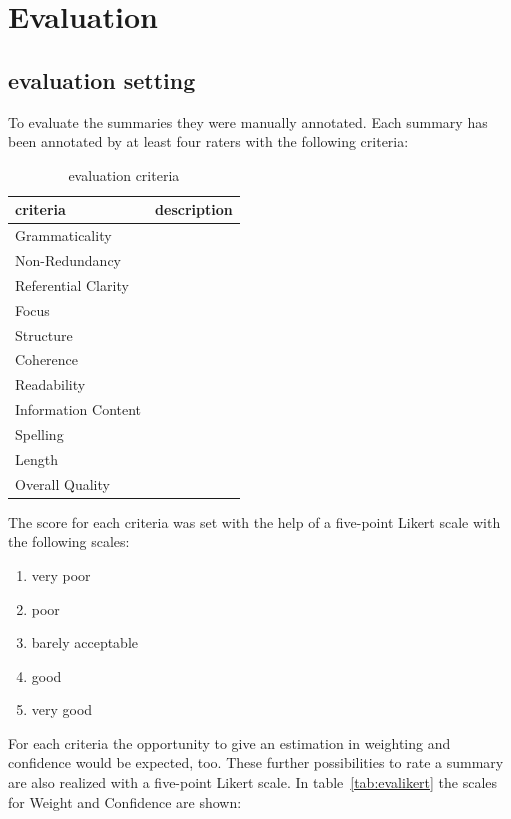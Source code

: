
\section{Evaluation}
\label{ch:evaluation}

\subsection{evaluation setting}
To evaluate the summaries they were manually annotated.
Each summary has been annotated by at least four raters with the following criteria:
\begin{table}[H]
	\begin{tabularx}{\textwidth}{l|X} \toprule
		criteria & description \\ \midrule
		Grammaticality      & \\
		Non-Redundancy      & \\
		Referential Clarity & \\
		Focus               & \\
		Structure           & \\
		Coherence           & \\
		Readability         & \\
		Information Content & \\
		Spelling            & \\
		Length              & \\
		Overall Quality     & \\ \bottomrule
	\end{tabularx}
	\caption{evaluation criteria}
	\label{tab:evacriteria}
\end{table}

The score for each criteria was set with the help of a five-point Likert scale with the following scales:

\begin{enumerate}
	\item very poor
	\item poor
	\item barely acceptable
	\item good
	\item very good
\end{enumerate}

For each criteria the opportunity to give an estimation in weighting and confidence would be expected, too.
These further possibilities to rate a summary are also realized with a five-point Likert scale.
In table~\ref{tab:evalikert} the scales for Weight and Confidence are shown:

